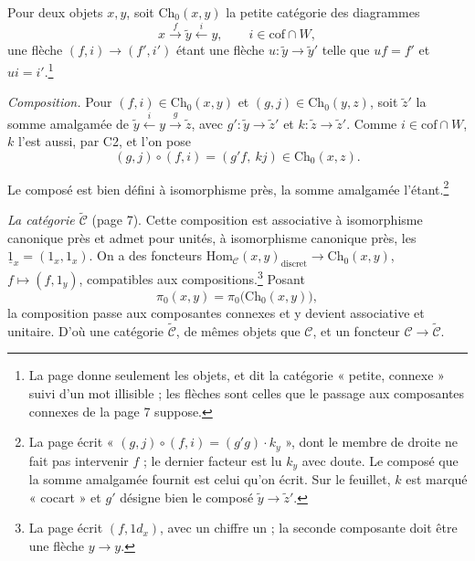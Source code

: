 \documentclass[11pt,a4paper]{article}
\begin{document}
Pour deux objets $x, y$, soit $\mathrm{Ch}_{0}(x,y)$ la petite catégorie des
diagrammes
\[
x \xrightarrow{\;f\;} \widetilde{y} \xleftarrow{\;i\;} y,
\qquad i \in \mathrm{cof} \cap W,
\]
une flèche $(f, i) \to (f', i')$ étant une flèche $u : \widetilde{y} \to
\widetilde{y}'$ telle que $uf = f'$ et $ui = i'$.\footnote{La page donne
seulement les objets, et dit la catégorie « petite, connexe » suivi d'un mot
illisible ; les flèches sont celles que le passage aux composantes connexes
de la page 7 suppose.}

\emph{Composition.} Pour $(f, i) \in \mathrm{Ch}_{0}(x,y)$ et $(g, j) \in
\mathrm{Ch}_{0}(y,z)$, soit $\widetilde{z}'$ la somme amalgamée de
$\widetilde{y} \xleftarrow{i} y \xrightarrow{g} \widetilde{z}$, avec
$g' : \widetilde{y} \to \widetilde{z}'$ et $k : \widetilde{z} \to
\widetilde{z}'$. Comme $i \in \mathrm{cof} \cap W$, $k$ l'est aussi, par C2, et
l'on pose
\[
(g, j) \circ (f, i) = (g' f,\ k j) \in \mathrm{Ch}_{0}(x,z).
\]


Le composé est bien défini à isomorphisme près, la somme amalgamée
l'étant.\footnote{La page écrit « $(g,j) \circ (f,i) = (g'g) \cdot k_{y}$ »,
dont le membre de droite ne fait pas intervenir $f$ ; le dernier facteur est
lu $k_{y}$ avec doute. Le composé que la somme amalgamée fournit est celui
qu'on écrit. Sur le feuillet, $k$ est marqué « cocart » et $g'$ désigne
bien le composé $\widetilde{y} \to \widetilde{z}'$.}

\emph{La catégorie $\widetilde{\mathcal{C}}$} (page 7). Cette composition est
associative à isomorphisme canonique près et admet pour unités, à
isomorphisme canonique près, les $\underline{1}_{x} = (1_{x}, 1_{x})$. On a
des foncteurs $\mathrm{Hom}_{\mathcal{C}}(x,y)_{\text{discret}} \to
\mathrm{Ch}_{0}(x,y)$, $f \mapsto (f, 1_{y})$, compatibles aux
compositions.\footnote{La page écrit $(f, 1d_{x})$, avec un chiffre un ; la
seconde composante doit être une flèche $y \to y$.} Posant
\[
\pi_{0}(x,y) = \pi_{0}\bigl(\mathrm{Ch}_{0}(x,y)\bigr),
\]
la composition passe aux composantes connexes et y devient associative et
unitaire. D'où une catégorie $\widetilde{\mathcal{C}}$, de mêmes objets que
$\mathcal{C}$, et un foncteur $\mathcal{C} \to \widetilde{\mathcal{C}}$.
\end{document}

